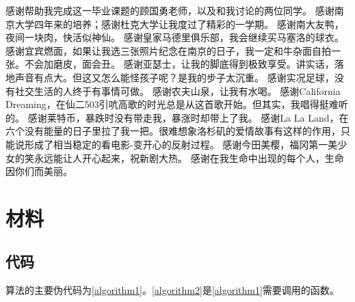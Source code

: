 \documentclass[macfonts]{njuthesis}
\begin{document}


\begin{acknowledgement}
感谢帮助我完成这一毕业课题的顾国勇老师，以及和我讨论的两位同学。
感谢南京大学四年来的培养；感谢杜克大学让我度过了精彩的一学期。
感谢南大友鸭，夜间一块肉，快活似神仙。
感谢皇家马德里俱乐部，我会继续买马塞洛的球衣。
感谢宜宾燃面，如果让我选三张照片纪念在南京的日子，我一定和牛杂面自拍一张。不会加磨皮，面会丑。
感谢亚瑟士，让我的脚底得到极致享受。讲实话，落地声音有点大。但这又怎么能怪孩子呢？是我的步子太沉重。
感谢实况足球，没有社交生活的人终于有事情可做。
感谢农夫山泉，让我有水喝。
感谢California Dreaming，在仙二503引吭高歌的时光总是从这首歌开始。但其实，我唱得挺难听的。
感谢莱特币，暴跌时没有带走我，暴涨时却带上了我。
感谢La La Land，在六个没有能量的日子里拉了我一把。很难想象洛杉矶的爱情故事有这样的作用，只能说形成了相当稳定的看电影-变开心的反射过程。
感谢今田美樱，福冈第一美少女的笑永远能让人开心起来，祝新剧大热。
感谢在我生命中出现的每个人，生命因你们而美丽。

\end{acknowledgement}


\appendix
\chapter{材料}
 \section{代码}
 \label{ap1}
 算法的主要伪代码为\ref{algorithm1}。\ref{algorithm2}是\ref{algorithm1}需要调用的函数。
\end{document}
